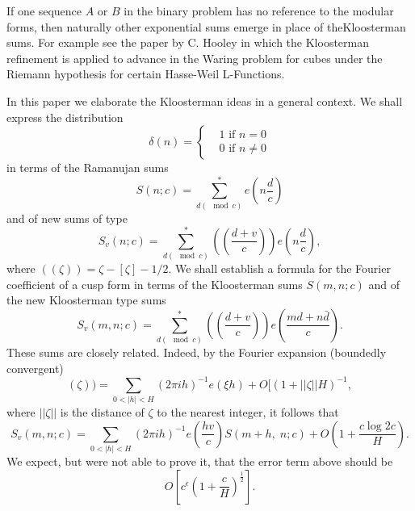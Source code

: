 If one sequence $A$ or $B$ in the binary problem has no reference to the modular forms, then naturally other exponential sums emerge in place of the\pageoriginale Kloosterman sums. For example see the paper by C. Hooley \cite{art6-key3} in which the Kloosterman refinement is applied to advance in the Waring problem for cubes under the Riemann hypothesis for certain Hasse-Weil L-Functions.

In this paper we elaborate the Kloosterman ideas in a general context. We shall express the distribution
$$
\delta(n) = 
\left\{
\begin{aligned}
& 1 \text{ if } n = 0\\
& 0 \text{ if } n \neq 0 
\end{aligned}
 \right.
$$
in terms of the Ramanujan sums
$$
S(n;c) =\sum\limits^\ast_{d(\mod c)} e \left(n \frac{d}{c} \right)
$$
and of new sums of type
$$
S_v (n; c) = \sum\limits^\ast_{d (\mod c)} \left(\left(\frac{d+v}{c} \right) \right) e \left(n \frac{d}{c} \right),
$$
where $((\zeta)) = \zeta - [\zeta] - 1/2$. We shall establish a formula for the Fourier coefficient of a cusp form in terms of the Kloosterman sums $S(m,n;c)$ and of the new Kloosterman type sums
$$
S_v (m, n;c) = \sum\limits^\ast_{d(\mod c)} \left(\left(\frac{d+v}{c} \right) \right) e \left(\frac{md+n\bar{d}}{c} \right).
$$
These sums are closely related. Indeed, by the Fourier expansion (boundedly convergent)
$$
(\zeta)) = \sum\limits_{0 < |h| < H} (2 \pi i h)^{-1} e (\xi h) + O [(1+ ||\zeta|| H)^{-1},
$$
where $||\zeta||$ is the distance of $\zeta$ to the nearest integer, it follows that
$$
S_v (m, n; c) = \sum\limits_{0 <|h| < H} (2\pi i h)^{-1} e \left(\frac{hv}{c} \right) S (m+h,\; n; c) + O \left(1+ \frac{c \log 2 c}{H} \right).
$$
We expect, but were not able to prove it, that the error term above should be 
$$
O\left[c^\epsilon \left(1+ \frac{c}{H} \right)^{\frac{1}{2}} \right].
$$


